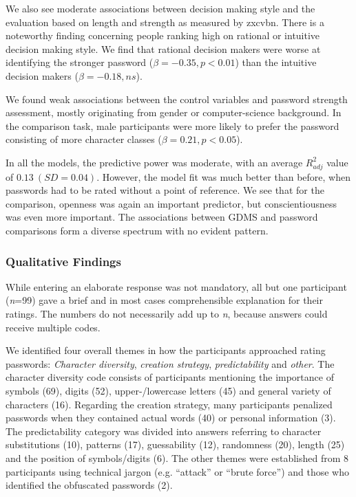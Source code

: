 We also see moderate associations between decision making style and the evaluation based on length and strength as measured by zxcvbn. There is a noteworthy finding concerning people ranking high on rational or intuitive decision making style. We find that rational decision makers were worse at identifying the stronger password ($\beta = -0.35, p < 0.01$) than the intuitive decision makers ($\beta = -0.18, ns$).  

We found weak associations between the control variables and password strength assessment, mostly originating from gender or computer-science background. In the comparison task, male participants were more likely to prefer the password consisting of more character classes ($\beta = 0.21, p < 0.05$). 

In all the models, the predictive power was moderate, with an average $R^2_{adj}$ value of $0.13~(SD=0.04)$. However, the model fit was much better than before, when passwords had to be rated without a point of reference. We see that for the comparison, openness was again an important predictor, but conscientiousness was even more important. The associations between GDMS and password comparisons form a diverse spectrum with no evident pattern. 

%

\subsubsection{Qualitative Findings}
While entering an elaborate response was not mandatory, all but one participant (\textit{n}=99) gave a brief and in most cases comprehensible explanation for their ratings. The numbers do not necessarily add up to \textit{n}, because answers could receive multiple codes.

We identified four overall themes in how the participants approached rating passwords: \textit{Character diversity}, \textit{creation strategy}, \textit{predictability} and \textit{other}. The character diversity code consists of participants mentioning the importance of symbols (69), digits (52), upper-/lowercase letters (45) and general variety of characters (16). Regarding the creation strategy, many participants penalized passwords when they contained actual words (40) or personal information (3). The predictability category was divided into answers referring to character substitutions (10), patterns (17), guessability (12), randomness (20), length (25) and the position of symbols/digits (6). The other themes were established from 8 participants using technical jargon (e.g. ``attack'' or ``brute force'') and those who identified the obfuscated passwords (2). 

